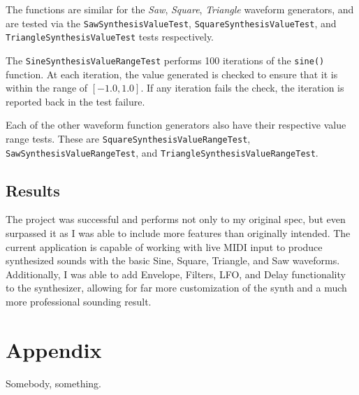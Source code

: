 \documentclass[a4paper,12pt]{report}
\begin{document}
The functions are similar for the \emph{Saw}, \emph{Square}, \emph{Triangle} waveform generators, and are tested via the \texttt{SawSynthesisValueTest}, \texttt{SquareSynthesisValueTest}, and \texttt{TriangleSynthesisValueTest} tests respectively.

The \texttt{SineSynthesisValueRangeTest} performs 100 iterations of the \texttt{sine()} function. At each iteration, the value generated is checked to ensure that it is within the range of $[-1.0,1.0]$. If any iteration fails the check, the iteration is reported back in the test failure.

Each of the other waveform function generators also have their respective value range tests. These are \texttt{SquareSynthesisValueRangeTest}, \texttt{SawSynthesisValueRangeTest}, and \texttt{TriangleSynthesisValueRangeTest}.

\section{Results}
The project was successful and performs not only to my original spec, but even surpassed it as I was able to include more features than originally intended. The current application is capable of working with live MIDI input to produce synthesized sounds with the basic Sine, Square, Triangle, and Saw waveforms. Additionally, I was able to add Envelope, Filters, LFO, and Delay functionality to the synthesizer, allowing for far more customization of the synth and a much more professional sounding result. 

\chapter{Appendix}


\begin{thebibliography}{9}
 Somebody, something.
\end{thebibliography}
\end{document}
